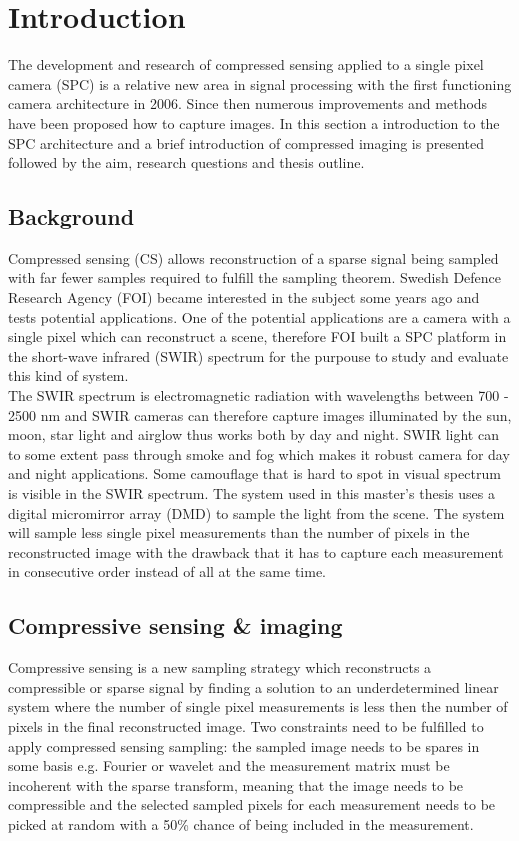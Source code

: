 \section{Introduction}
The development and research of compressed sensing applied to a single pixel camera (SPC) is a relative new area in signal processing with the first functioning camera architecture in 2006. Since then numerous improvements and methods have been proposed how to capture images. In this section a introduction to the SPC architecture and a brief introduction of compressed imaging is presented followed by the aim, research questions and thesis outline. 



\subsection{Background}
Compressed sensing (CS) allows reconstruction of a sparse signal being sampled with far fewer samples required to fulfill the sampling theorem. Swedish Defence Research Agency (FOI) became interested in the subject some years ago and tests potential applications. One of the potential applications are a camera with a single pixel which can reconstruct a scene, therefore FOI built a SPC platform in the short-wave infrared (SWIR) spectrum for the purpouse to study and evaluate this kind of system.\\[0.1in]

The SWIR spectrum is electromagnetic radiation with wavelengths between 700 - 2500 nm and SWIR cameras can therefore capture images illuminated by the sun, moon, star light and airglow thus works both by day and night. SWIR light can to some extent pass through smoke and fog which makes it robust camera for day and night applications. Some camouflage that is hard to spot in visual spectrum is visible in the SWIR spectrum. The system used in this master’s thesis uses a digital micromirror array (DMD) to sample the light from the scene. The system will sample less single pixel measurements than the number of pixels in the reconstructed image with the drawback that it has to capture each measurement in consecutive order instead of all at the same time.

\subsection{Compressive sensing \& imaging}
Compressive sensing is a new sampling strategy which reconstructs a compressible or sparse signal by finding a solution to an underdetermined linear system where the number of single pixel measurements is less then the number of pixels in the final reconstructed image. Two constraints need to be fulfilled to apply compressed sensing sampling: the sampled image needs to be spares in some basis e.g. Fourier or wavelet and the measurement matrix must be incoherent with the sparse transform, meaning that the image needs to be compressible and the selected sampled pixels for each measurement needs to be picked at random with a 50\% chance of being included in the measurement. \\[0.1in]

